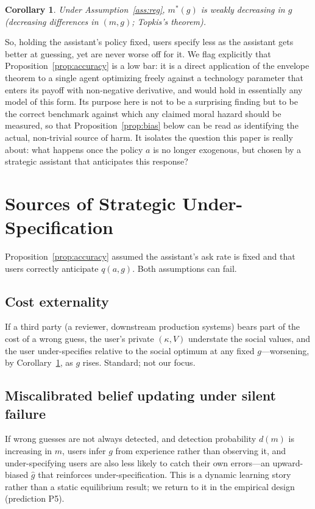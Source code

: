\documentclass[11pt]{article}
\newtheorem{corollary}{Corollary}
\begin{document}
\begin{corollary}\label{cor:mono}
Under Assumption~\ref{ass:reg}, $m^*(g)$ is weakly decreasing in $g$ (decreasing
differences in $(m,g)$; Topkis's theorem).
\end{corollary}

So, holding the assistant's policy fixed, users specify less as the assistant gets
better at guessing, yet are never worse off for it. We flag explicitly that
Proposition~\ref{prop:accuracy} is a low bar: it is a direct application of the
envelope theorem to a single agent optimizing freely against a technology
parameter that enters its payoff with non-negative derivative, and would hold in
essentially any model of this form. Its purpose here is not to be a surprising
finding but to be the correct benchmark against which any claimed moral hazard
should be measured, so that Proposition~\ref{prop:bias} below can be read as
identifying the actual, non-trivial source of harm. It isolates the
question this paper is really about: what happens once the policy $a$ is no longer
exogenous, but chosen by a strategic assistant that anticipates this response?

\section{Sources of Strategic Under-Specification}

Proposition~\ref{prop:accuracy} assumed the assistant's ask rate is fixed and that
users correctly anticipate $q(a,g)$. Both assumptions can fail.

\subsection{Cost externality}
If a third party (a reviewer, downstream production systems) bears part of the
cost of a wrong guess, the user's private $(\kappa, V)$ understate the social
values, and the user under-specifies relative to the social optimum at any fixed
$g$---worsening, by Corollary~\ref{cor:mono}, as $g$ rises. Standard; not our focus.

\subsection{Miscalibrated belief updating under silent failure}
If wrong guesses are not always detected, and detection probability $d(m)$ is
increasing in $m$, users infer $g$ from experience rather than observing it, and
under-specifying users are also less likely to catch their own errors---an
upward-biased $\hat g$ that reinforces under-specification. This is a dynamic
learning story rather than a static equilibrium result; we return to it in the
empirical design (prediction P5).
\end{document}
